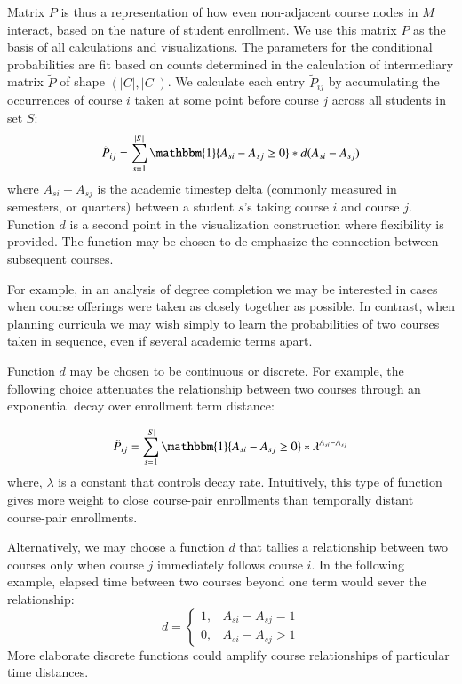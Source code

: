 \documentclass{sigchi}
\begin{document}
Matrix $P$ is thus a representation of how even non-adjacent course nodes in $M$ interact, based on the nature of student enrollment. We use this matrix $P$ as the basis of all calculations and visualizations. 
 The parameters for the conditional probabilities are fit based on counts determined in the calculation of intermediary matrix $\tilde{P}$ of shape $(|C|, |C|)$. We calculate each entry $\tilde{P}_{ij}$ by accumulating the occurrences of course $i$ taken at some point before course $j$ across all students in set $S$:
\begin{equation}
  \tilde{P}_{ij} = \sum_{s=1}^{|S|} \mathbbm{1}\{A_{si} - A_{sj} \geq 0\}* d(A_{si} - A_{sj})
\end{equation}
where $A_{si} - A_{sj}$ is the academic timestep delta (commonly
measured in semesters, or quarters) between a student $s$'s taking
course $i$ and course $j$. Function $d$ is a second point in the
visualization construction where flexibility is provided. The function
may be chosen to de-emphasize the connection between subsequent
courses.

For example, in an analysis of degree completion we may be interested
in cases when course offerings were taken as closely together as
possible. In contrast, when planning curricula we may wish simply to
learn the probabilities of two courses taken in sequence, even if
several academic terms apart.

Function $d$ may be chosen to be continuous or discrete.  For example,
the following choice attenuates the relationship between two courses
through an exponential decay over enrollment term distance:

\begin{equation}
  \tilde{P}_{ij} = \sum_{s=1}^{|S|} \mathbbm{1}\{A_{si} - A_{sj} \geq 0\}* \lambda^{A_{si} - A_{sj}}
\end{equation}
where, $\lambda$ is a constant that controls decay rate. Intuitively, this type of function gives more weight to close course-pair enrollments than temporally distant course-pair enrollments.

Alternatively, we may choose a function $d$ that tallies a
relationship between two courses only when course $j$ immediately
follows course $i$. In the following example, elapsed time between two
courses beyond one term would sever the relationship:
\begin{equation}
d = \begin{cases} 
      1, & A_{si} - A_{sj} = 1 \\
      0, & A_{si} - A_{sj} > 1 
    \end{cases}
\end{equation}
More elaborate discrete functions could amplify course relationships of
particular time distances.
\end{document}
